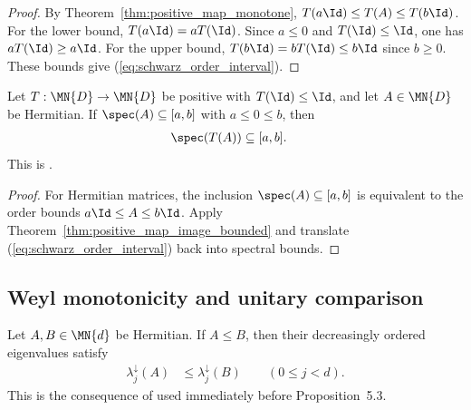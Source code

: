 \begin{proof}
    \leanok
    By Theorem~\ref{thm:positive_map_monotone},
    $T(a\Id)\le T(A)\le T(b\Id)$.
    For the lower bound, $T(a\Id)=aT(\Id)$.
    Since $a\le0$ and $T(\Id)\le\Id$, one has $aT(\Id)\ge a\Id$.
    For the upper bound, $T(b\Id)=bT(\Id)\le b\Id$ since $b\ge0$.
    These bounds give (\ref{eq:schwarz_order_interval}).
\end{proof}

\begin{theorem}
    \label{thm:positive_map_spectrum_contractivity}
    \leanok
    Let $T:\MN{D}\to\MN{D}$ be positive with $T(\Id)\le\Id$, and let
    $A\in\MN{D}$ be Hermitian.
    If $\spec(A)\subseteq[a,b]$ with $a\le0\le b$, then
    \begin{align}
        \spec(T(A))
         & \subseteq[a,b].
        \notag
    \end{align}
    This is \cite[Equation~(5.21)]{Wolf2012Quantum}.
\end{theorem}

\begin{proof}
    \leanok
    For Hermitian matrices, the inclusion
    $\spec(A)\subseteq[a,b]$ is equivalent to the order bounds
    $a\Id\le A\le b\Id$.
    Apply Theorem~\ref{thm:positive_map_image_bounded} and translate
    (\ref{eq:schwarz_order_interval}) back into spectral bounds.
\end{proof}

\subsection{Weyl monotonicity and unitary comparison}

\begin{theorem}
    \label{thm:weyl_monotonicity_loewner}
    \leanok
    Let $A,B\in\MN{d}$ be Hermitian. If $A\leq B$, then their decreasingly
    ordered eigenvalues satisfy
    \begin{align}
        \lambda_j^\downarrow(A)
         & \leq \lambda_j^\downarrow(B)
        \qquad (0\leq j<d).
        \label{eq:schwarz_weyl_monotonicity}
    \end{align}
    This is the consequence of \cite[Equation~(5.56)]{Wolf2012Quantum}
    used immediately before Proposition~5.3.
\end{theorem}

